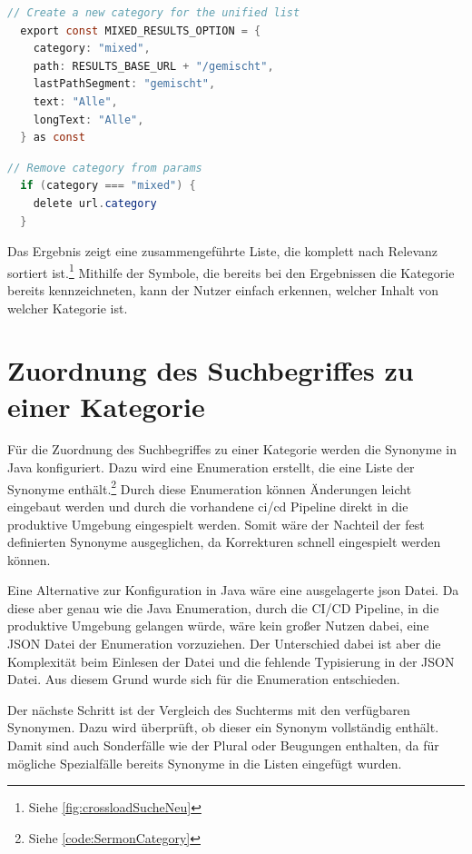 \clearpage
\begin{lstlisting}[language=Java, title={Erstellen der gemischten Kategorie \cite{frontend2022}}]
  // Create a new category for the unified list
  export const MIXED_RESULTS_OPTION = {
    category: "mixed",
    path: RESULTS_BASE_URL + "/gemischt",
    lastPathSegment: "gemischt",
    text: "Alle",
    longText: "Alle",
  } as const
\end{lstlisting}

\begin{lstlisting}[language=Java, title={Löschen der Kategorie aus den API Parametern \cite{frontend2022}}]
  // Remove category from params
  if (category === "mixed") {
    delete url.category
  }
\end{lstlisting}

Das Ergebnis zeigt eine zusammengeführte Liste, die komplett nach Relevanz sortiert ist.\footnote{Siehe \ref{fig:crossloadSucheNeu}}
Mithilfe der Symbole, die bereits bei den Ergebnissen die Kategorie bereits kennzeichneten, kann der Nutzer einfach erkennen, welcher Inhalt von welcher Kategorie ist.

\section{Zuordnung des Suchbegriffes zu einer Kategorie}
\label{sec:devKeywords}

Für die Zuordnung des Suchbegriffes zu einer Kategorie werden die Synonyme in Java konfiguriert.
Dazu wird eine Enumeration erstellt, die eine Liste der Synonyme enthält.\footnote{Siehe \ref{code:SermonCategory}}
Durch diese Enumeration können Änderungen leicht eingebaut werden und durch die vorhandene \gls{ci}/\gls{cd} Pipeline direkt in die produktive Umgebung eingespielt werden.
Somit wäre der Nachteil der fest definierten Synonyme ausgeglichen, da Korrekturen schnell eingespielt werden können.

Eine Alternative zur Konfiguration in Java wäre eine ausgelagerte \gls{json} Datei.
Da diese aber genau wie die Java Enumeration, durch die CI/CD Pipeline, in die produktive Umgebung gelangen würde, wäre kein großer Nutzen dabei, eine JSON Datei der Enumeration vorzuziehen.
Der Unterschied dabei ist aber die Komplexität beim Einlesen der Datei und die fehlende Typisierung in der JSON Datei.
Aus diesem Grund wurde sich für die Enumeration entschieden.

Der nächste Schritt ist der Vergleich des Suchterms mit den verfügbaren Synonymen.
Dazu wird überprüft, ob dieser ein Synonym vollständig enthält.
Damit sind auch Sonderfälle wie der Plural oder Beugungen enthalten, da für mögliche Spezialfälle bereits Synonyme in die Listen eingefügt wurden.

